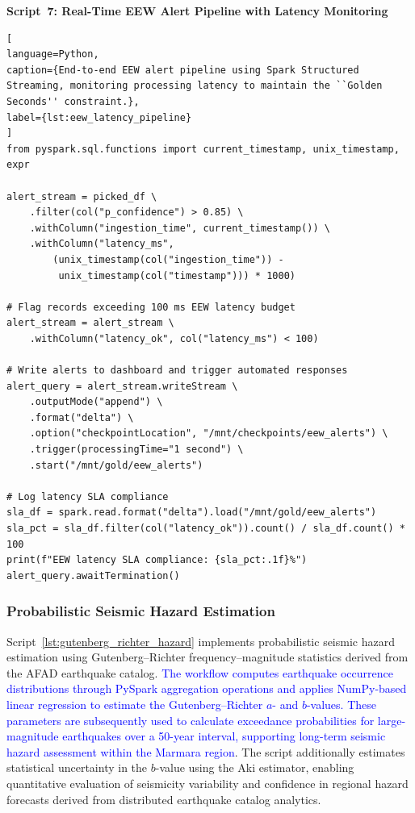 \documentclass[data,article,submit,pdftex,moreauthors]{Definitions/mdpi}
\begin{document}
\textbf{Script~7: Real-Time EEW Alert Pipeline with Latency Monitoring}

\begin{lstlisting}[
language=Python,
caption={End-to-end EEW alert pipeline using Spark Structured Streaming, monitoring processing latency to maintain the ``Golden Seconds'' constraint.},
label={lst:eew_latency_pipeline}
]
from pyspark.sql.functions import current_timestamp, unix_timestamp, expr

alert_stream = picked_df \
    .filter(col("p_confidence") > 0.85) \
    .withColumn("ingestion_time", current_timestamp()) \
    .withColumn("latency_ms",
        (unix_timestamp(col("ingestion_time")) -
         unix_timestamp(col("timestamp"))) * 1000)

# Flag records exceeding 100 ms EEW latency budget
alert_stream = alert_stream \
    .withColumn("latency_ok", col("latency_ms") < 100)

# Write alerts to dashboard and trigger automated responses
alert_query = alert_stream.writeStream \
    .outputMode("append") \
    .format("delta") \
    .option("checkpointLocation", "/mnt/checkpoints/eew_alerts") \
    .trigger(processingTime="1 second") \
    .start("/mnt/gold/eew_alerts")

# Log latency SLA compliance
sla_df = spark.read.format("delta").load("/mnt/gold/eew_alerts")
sla_pct = sla_df.filter(col("latency_ok")).count() / sla_df.count() * 100
print(f"EEW latency SLA compliance: {sla_pct:.1f}%")
alert_query.awaitTermination()
\end{lstlisting}

\subsubsection{Probabilistic Seismic Hazard Estimation}

Script~\ref{lst:gutenberg_richter_hazard} implements probabilistic seismic hazard estimation using Gutenberg--Richter frequency--magnitude statistics derived from the AFAD earthquake catalog. \textcolor{blue}{The workflow computes earthquake occurrence distributions through PySpark aggregation operations and applies NumPy-based linear regression to estimate the Gutenberg--Richter $a$- and $b$-values. These parameters are subsequently used to calculate exceedance probabilities for large-magnitude earthquakes over a 50-year interval, supporting long-term seismic hazard assessment within the Marmara region}. The script additionally estimates statistical uncertainty in the $b$-value using the Aki estimator, enabling quantitative evaluation of seismicity variability and confidence in regional hazard forecasts derived from distributed earthquake catalog analytics.
\end{document}
